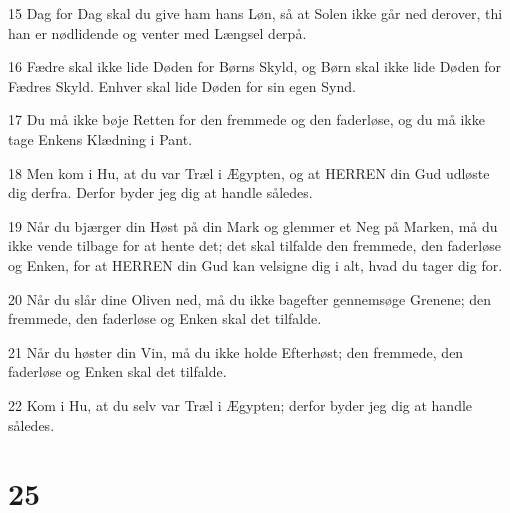 \par 15 Dag for Dag skal du give ham hans Løn, så at Solen ikke går ned derover, thi han er nødlidende og venter med Længsel derpå.
\par 16 Fædre skal ikke lide Døden for Børns Skyld, og Børn skal ikke lide Døden for Fædres Skyld. Enhver skal lide Døden for sin egen Synd.
\par 17 Du må ikke bøje Retten for den fremmede og den faderløse, og du må ikke tage Enkens Klædning i Pant.
\par 18 Men kom i Hu, at du var Træl i Ægypten, og at HERREN din Gud udløste dig derfra. Derfor byder jeg dig at handle således.
\par 19 Når du bjærger din Høst på din Mark og glemmer et Neg på Marken, må du ikke vende tilbage for at hente det; det skal tilfalde den fremmede, den faderløse og Enken, for at HERREN din Gud kan velsigne dig i alt, hvad du tager dig for.
\par 20 Når du slår dine Oliven ned, må du ikke bagefter gennemsøge Grenene; den fremmede, den faderløse og Enken skal det tilfalde.
\par 21 Når du høster din Vin, må du ikke holde Efterhøst; den fremmede, den faderløse og Enken skal det tilfalde.
\par 22 Kom i Hu, at du selv var Træl i Ægypten; derfor byder jeg dig at handle således.

\chapter{25}

